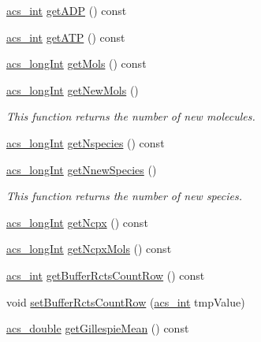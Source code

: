 \begin{DoxyCompactItemize}
\hyperlink{a00024_a8d277355641a098190360234e2ebde35}{acs\-\_\-int} \hyperlink{a00011_a69d18914fe7c8e96b10992668960b83b}{get\-A\-D\-P} () const 
\item 
\hyperlink{a00024_a8d277355641a098190360234e2ebde35}{acs\-\_\-int} \hyperlink{a00011_a02346c5d824e83e0a76dd01f4672ad8b}{get\-A\-T\-P} () const 
\item 
\hyperlink{a00024_a19319d75f02db4308bc5c0026d98cd85}{acs\-\_\-long\-Int} \hyperlink{a00011_a5a2ee72147144e7a04f4b363f1cc0914}{get\-Mols} () const 
\item 
\hyperlink{a00024_a19319d75f02db4308bc5c0026d98cd85}{acs\-\_\-long\-Int} \hyperlink{a00011_acae65ac60e1d746dc3063ae7948b684e}{get\-New\-Mols} ()
\begin{DoxyCompactList}\small\item\em This function returns the number of new molecules. \end{DoxyCompactList}\item 
\hyperlink{a00024_a19319d75f02db4308bc5c0026d98cd85}{acs\-\_\-long\-Int} \hyperlink{a00011_aebc2bf6d400686a73dae1f6162cfeadc}{get\-Nspecies} () const 
\item 
\hyperlink{a00024_a19319d75f02db4308bc5c0026d98cd85}{acs\-\_\-long\-Int} \hyperlink{a00011_a35fc896cc5fb146855f628e8c2067023}{get\-Nnew\-Species} ()
\begin{DoxyCompactList}\small\item\em This function returns the number of new species. \end{DoxyCompactList}\item 
\hyperlink{a00024_a19319d75f02db4308bc5c0026d98cd85}{acs\-\_\-long\-Int} \hyperlink{a00011_a5f6c40cbf788d58db588dc6280f0174f}{get\-Ncpx} () const 
\item 
\hyperlink{a00024_a19319d75f02db4308bc5c0026d98cd85}{acs\-\_\-long\-Int} \hyperlink{a00011_a39bb98a336b69f25479b8f82b9928bd3}{get\-Ncpx\-Mols} () const 
\item 
\hyperlink{a00024_a8d277355641a098190360234e2ebde35}{acs\-\_\-int} \hyperlink{a00011_ab87d94260cc7a7b388deca45fddb6031}{get\-Buffer\-Rcts\-Count\-Row} () const 
\item 
void \hyperlink{a00011_a634e0560af8805958d99e0ad8f0b5feb}{set\-Buffer\-Rcts\-Count\-Row} (\hyperlink{a00024_a8d277355641a098190360234e2ebde35}{acs\-\_\-int} tmp\-Value)
\item 
\hyperlink{a00024_ab776853a005fcbf56af0424a2a4dd607}{acs\-\_\-double} \hyperlink{a00011_a389a70abe42c7652c9511b7ed3b974c0}{get\-Gillespie\-Mean} () const 
\item 

\end{DoxyCompactItemize}
